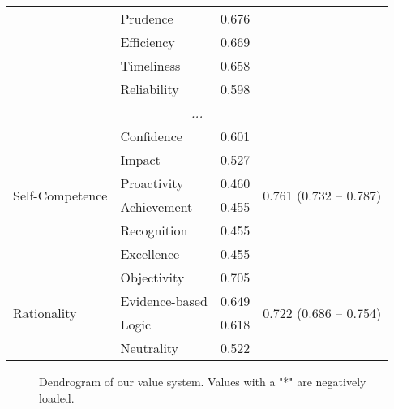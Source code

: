 \begin{table}[h!]
\begin{tabular}{llcc}
                                  &  Prudence  & 0.676 & \\
                                  &  Efficiency  & 0.669 & \\
                                  &  Timeliness  & 0.658 & \\
                                  &  Reliability  & 0.598 & \\
                                  \multicolumn{4}{c}{\textit{...}} \\
        \midrule
        \multirow{6}{*}{Self-Competence}
                                  & Confidence   & 0.601 & \multirow{6}{*}{0.761 (0.732 -- 0.787)} \\
                                  & Impact       & 0.527 & \\
                                  & Proactivity  & 0.460 & \\
                                  & Achievement  & 0.455 & \\
                                  & Recognition  & 0.455 & \\
                                  & Excellence   & 0.455 & \\
        \midrule
        \multirow{4}{*}{Rationality}
                                  & Objectivity & 0.705 & \multirow{4}{*}{0.722 (0.686 -- 0.754)} \\
                                  & Evidence-based & 0.649 & \\
                                  & Logic & 0.618 & \\
                                  & Neutrality & 0.522 & \\
        \bottomrule
    \end{tabular}
    \label{tab:factor loadings}
\end{table}



\begin{figure*}[htbp]
    \begin{floatrow}
        {\caption{Dendrogram of our value system. Values with a "*" are negatively loaded.} \label{fig:dendrogram}}
        \killfloatstyle
        {}
    \end{floatrow}
\end{figure*}


